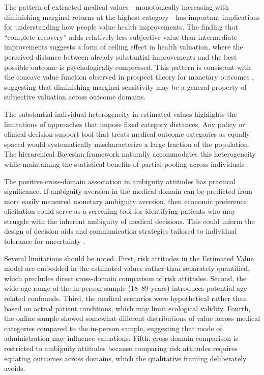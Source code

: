 \documentclass[12pt]{article}
\begin{document}
The pattern of extracted medical values---monotonically increasing with diminishing marginal returns at the highest category---has important implications for understanding how people value health improvements. The finding that ``complete recovery'' adds relatively less subjective value than intermediate improvements suggests a form of ceiling effect in health valuation, where the perceived distance between already-substantial improvements and the best possible outcome is psychologically compressed. This pattern is consistent with the concave value function observed in prospect theory for monetary outcomes \citep{kahneman1979prospect, tversky1992advances}, suggesting that diminishing marginal sensitivity may be a general property of subjective valuation across outcome domains.

The substantial individual heterogeneity in estimated values highlights the limitations of approaches that impose fixed category distances. Any policy or clinical decision-support tool that treats medical outcome categories as equally spaced would systematically mischaracterize a large fraction of the population. The hierarchical Bayesian framework naturally accommodates this heterogeneity while maintaining the statistical benefits of partial pooling across individuals \citep{gelman2013bayesian}.

The positive cross-domain association in ambiguity attitudes has practical significance. If ambiguity aversion in the medical domain can be predicted from more easily measured monetary ambiguity aversion, then economic preference elicitation could serve as a screening tool for identifying patients who may struggle with the inherent ambiguity of medical decisions. This could inform the design of decision aids and communication strategies tailored to individual tolerance for uncertainty \citep{hsu2005neural}.

Several limitations should be noted. First, risk attitudes in the Estimated Value model are embedded in the estimated values rather than separately quantified, which precludes direct cross-domain comparison of risk attitudes. Second, the wide age range of the in-person sample (18--89 years) introduces potential age-related confounds. Third, the medical scenarios were hypothetical rather than based on actual patient conditions, which may limit ecological validity. Fourth, the online sample showed somewhat different distributions of value across medical categories compared to the in-person sample, suggesting that mode of administration may influence valuations. Fifth, cross-domain comparison is restricted to ambiguity attitudes because comparing risk attitudes requires equating outcomes across domains, which the qualitative framing deliberately avoids.
\end{document}
